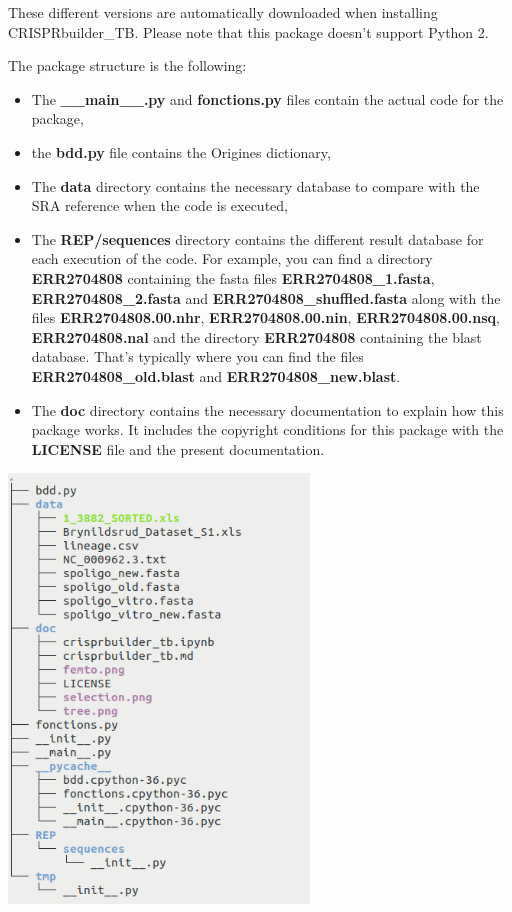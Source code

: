 \documentclass[twoside,a4paper,11pt,frenchb,openany]{report}
\begin{document}
These different versions are automatically downloaded when installing
CRISPRbuilder\_TB. Please note that this package doesn't support Python
2.

    The package structure is the following:

    \begin{itemize}
\item
  The \textbf{\_\_main\_\_.py} and \textbf{fonctions.py} files contain
  the actual code for the package,
\item
  the \textbf{bdd.py} file contains the Origines dictionary,
\item
  The \textbf{data} directory contains the necessary database to compare
  with the SRA reference when the code is executed,
\item
  The \textbf{REP/sequences} directory contains the different result
  database for each execution of the code. For example, you can find a
  directory \textbf{ERR2704808} containing the fasta files \textbf{ERR2704808\_1.fasta},
  \textbf{ERR2704808\_2.fasta} and \textbf{ERR2704808\_shuffled.fasta} along with the
  files \textbf{ERR2704808.00.nhr}, \textbf{ERR2704808.00.nin}, \textbf{ERR2704808.00.nsq},\\
  \textbf{ERR2704808.nal} and the directory \textbf{ERR2704808} containing the blast
  database. That's typically where you can find the files
  \textbf{ERR2704808\_old.blast} and \textbf{ERR2704808\_new.blast}.
\item
  The \textbf{doc} directory contains the necessary documentation to
  explain how this package works. It includes the copyright conditions for this package with the
  \textbf{LICENSE} file and the present documentation.
\end{itemize}

\includegraphics[width=8cm]{rep_crispr.png}
\end{document}
